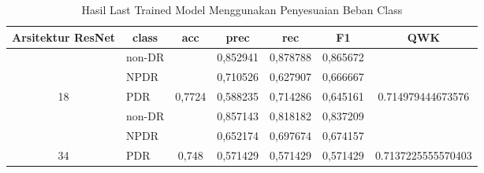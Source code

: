 \begin{table}[hbtp]
	\begin{center}
		\caption{Hasil Last Trained Model Menggunakan Penyesuaian Beban Class}
		\label{tb:HasilLastClassWeight}
		\begin{tabular}{|c|l|c|l|l|l|c|}
			\hline
			\rowcolor[HTML]{C0C0C0} 
			Arsitektur ResNet     & \multicolumn{1}{c|}{\cellcolor[HTML]{C0C0C0}class} & acc                      & \multicolumn{1}{c|}{\cellcolor[HTML]{C0C0C0}prec} & \multicolumn{1}{c|}{\cellcolor[HTML]{C0C0C0}rec} & \multicolumn{1}{c|}{\cellcolor[HTML]{C0C0C0}F1} & QWK                                  \\ \hline
			& non-DR                                             &                          & 0,852941                                          & 0,878788                                         & 0,865672                                        &                                      \\ \cline{2-2} \cline{4-6}
			& NPDR                                               &                          & 0,710526                                          & 0,627907                                         & 0,666667                                        &                                      \\ \cline{2-2} \cline{4-6}
			\multirow{-3}{*}{18}  & PDR                                                & \multirow{-3}{*}{0,7724} & 0,588235                                          & 0,714286                                         & 0,645161                                        & \multirow{-3}{*}{0.714979444673576}  \\ \hline
			& non-DR                                             &                          & 0,857143                                          & 0,818182                                         & 0,837209                                        &                                      \\ \cline{2-2} \cline{4-6}
			& NPDR                                               &                          & 0,652174                                          & 0,697674                                         & 0,674157                                        &                                      \\ \cline{2-2} \cline{4-6}
			\multirow{-3}{*}{34}  & PDR                                                & \multirow{-3}{*}{0,748}  & 0,571429                                          & 0,571429                                         & 0,571429                                        & \multirow{-3}{*}{0.7137225555570403} \\ \hline

\end{tabular}
\end{center}
\end{table}
